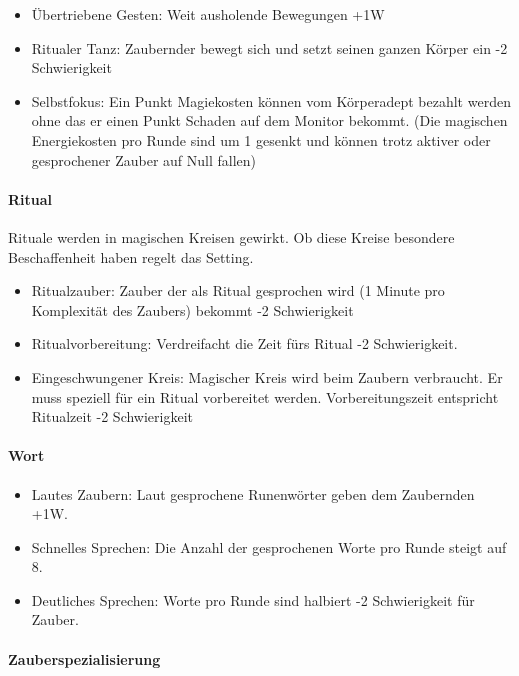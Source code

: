 \documentclass{article}
\begin{document}
\begin{itemize}
\item Übertriebene Gesten: Weit ausholende Bewegungen +1W
\item Ritualer Tanz: Zaubernder bewegt sich und setzt seinen ganzen Körper ein -2 Schwierigkeit
\item Selbstfokus: Ein Punkt Magiekosten können vom Körperadept bezahlt werden ohne das er einen Punkt Schaden auf dem Monitor bekommt. (Die magischen Energiekosten pro Runde sind um 1 gesenkt und können trotz aktiver oder gesprochener Zauber auf Null fallen)
\end{itemize}

\paragraph{Ritual}

Rituale werden in magischen Kreisen gewirkt. Ob diese Kreise besondere Beschaffenheit haben regelt das Setting.

\begin{itemize}
\item Ritualzauber: Zauber der als Ritual gesprochen wird (1 Minute pro Komplexität des Zaubers) bekommt -2 Schwierigkeit
\item Ritualvorbereitung: Verdreifacht die Zeit fürs Ritual -2 Schwierigkeit.
\item Eingeschwungener Kreis: Magischer Kreis wird beim Zaubern verbraucht. Er muss speziell für ein Ritual vorbereitet werden. Vorbereitungszeit entspricht Ritualzeit -2 Schwierigkeit
\end{itemize}

\paragraph{Wort}

\begin{itemize}
\item Lautes Zaubern: Laut gesprochene Runenwörter geben dem Zaubernden +1W.
\item Schnelles Sprechen: Die Anzahl der gesprochenen Worte pro Runde steigt auf 8.
\item Deutliches Sprechen: Worte pro Runde sind halbiert -2 Schwierigkeit für Zauber.
\end{itemize}

\paragraph{Zauberspezialisierung}
\end{document}
